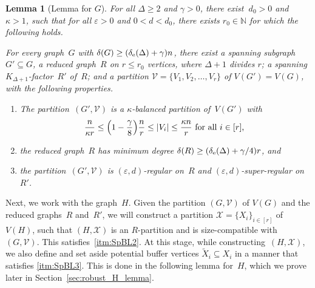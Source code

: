 \documentclass[final]{article}
\newtheorem{lemma}[theorem]{Lemma}
\theoremstyle{definition}
\newcommand{\itmarab}[1]{\mbox{\rm 
({\it #1}\,\arabic{*}\hspace{0.05em})}}
\newcommand{\eps}{\varepsilon}
\newcommand{\exth}{\delta_{\rm e}(\Delta)}
\let\tilde\widetilde
\begin{document}
\begin{lemma}[Lemma for $G$]
    \label{lem:G_lemma}
    For all $\Delta \geq 2$ and $\gamma > 0$, there exist $\ d_0 > 0$ and $\kappa > 1$, such that for all $\eps > 0$ and $0 < d < d_0$, there exists $r_0 \in \mathbb{N}$ for which the following holds.
    
    For every graph~$G$ with $\delta(G) \geq (\exth + \gamma )n$, there exist a spanning subgraph~$G' \subseteq G$, a reduced graph~$R$ on $r \leq r_0$ vertices, where $\Delta+1$ divides $r$; a spanning $K_{\Delta+1}$-factor~$R'$ of~$R$; and a partition $\mathcal{V} = \{V_1, V_2, \dots, V_{r}\}$ of $V(G') = V(G)$, with the following properties.
    \begin{enumerate}[label=\itmarab{G}]
    \item \label{itm:G1} The partition~$(G',\mathcal{V})$ is a $\kappa$-balanced partition of~$V(G')$ with $$\frac{n}{\kappa r} \leq \Bigl(1 - \frac{\gamma}{8}\Bigr) \frac{n}{r} \leq |V_i| \leq \frac{\kappa n}{r} \text{ for all $i \in [r]$, }$$
    \item \label{itm:G2}the reduced graph~$R$ has minimum degree $\delta(R) \geq (\exth+ \gamma/4)r$, and
    \item \label{itm:G3} the partition~$(G', \mathcal{V})$ is $(\eps, d)$-regular on~$R$ and $(\eps, d)$-super-regular on~$R'$.
    \end{enumerate}
    \end{lemma}
    

 Next, we work with the graph~$H$. Given the partition $(G, \mathcal{V})$ of $V(G)$ and the reduced graphs~$R$ and~$R'$, we will construct a partition $\mathcal{X} = \{X_i\}_{i \in [r]}$ of $V(H)$, such that $(H, \mathcal{X})$ is an $R$-partition and is size-compatible with~$(G,\mathcal{V})$. This  satisfies~\ref{itm:SpBL2}. At this stage, while constructing~$(H, \mathcal{X})$, we also define and set aside potential buffer vertices $\tilde{X}_i \subseteq X_i$ in a manner that satisfies \ref{itm:SpBL3}. This is done in the following lemma for~$H$, which we prove later in Section~\ref{sec:robust_H_lemma}.
\end{document}
